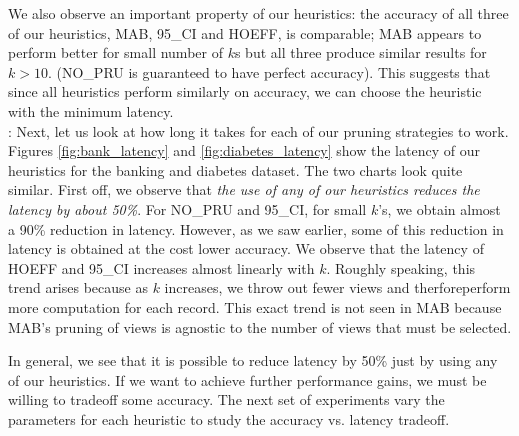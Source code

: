 We also observe an important property of our heuristics: the accuracy of all
three of our heuristics, MAB, 95\_CI and HOEFF, is comparable; MAB appears to
perform better for small number of $k$s but all three produce similar results
for $k>10$. (NO\_PRU is guaranteed to have perfect accuracy).
This suggests that since all heuristics perform similarly on accuracy, we can
choose the heuristic with the minimum latency.\\


:
Next, let us look at how long it takes for each of our pruning strategies to
work.
Figures \ref{fig:bank_latency} and \ref{fig:diabetes_latency} show the latency
of our heuristics for the banking and diabetes dataset.
The two charts look quite similar.
First off, we observe that {\it the use of any of our heuristics reduces the
latency by about 50\%}.
For NO\_PRU and 95\_CI, for small $k$'s, we obtain almost a 90\% reduction in
latency. However, as we saw earlier, some of this reduction in latency is
obtained at the cost lower accuracy.
We observe that the latency of HOEFF and 95\_CI increases almost linearly
with $k$.
Roughly speaking, this trend arises because as $k$
increases, we throw out fewer views and therforeperform more
computation for each record.
This exact trend is not seen in MAB because MAB's pruning of views is agnostic
to the number of views that must be selected.

In general, we see that it is possible to reduce latency by 50\% just by using
any of our heuristics.
If we want to achieve further performance gains, we must be willing to
tradeoff some accuracy.
The next set of experiments vary the parameters for each heuristic to study
the accuracy vs. latency tradeoff.\\


